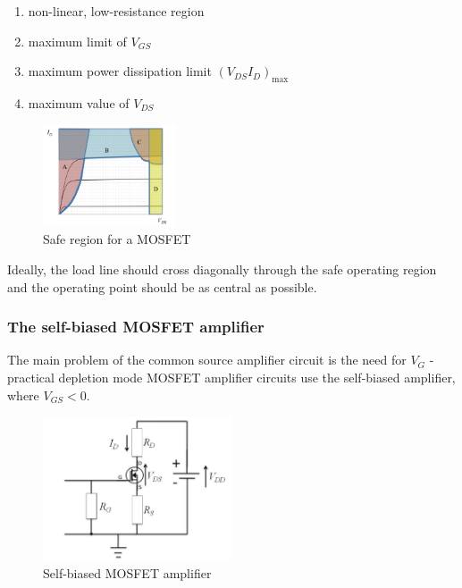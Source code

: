 \documentclass{article}
\begin{document}
\begin{enumerate}
    \item non-linear, low-resistance region
    \item maximum limit of $V_{GS}$
    \item maximum power dissipation limit $(V_{DS}I_D)_{\text{max}}$
    \item maximum value of $V_{DS}$
\end{enumerate}

\begin{figure}[h]
    \centering
    \includegraphics[width = 0.35\textwidth]{images/fet5.png}
    \caption{Safe region for a MOSFET}
    \label{fig:fet5}
\end{figure}

Ideally, the load line should cross diagonally through the safe operating region and the operating point should be as central as possible.

\subsubsection{The self-biased MOSFET amplifier}

The main problem of the common source amplifier circuit is the need for $V_G$ - practical depletion mode MOSFET amplifier circuits use the self-biased amplifier, where $V_{GS} < 0$.

\begin{figure}[h]
    \centering
    \includegraphics[width = 0.5\textwidth]{images/fet6.png}
    \caption{Self-biased MOSFET amplifier}
    \label{fig:enter-label}
\end{figure}
\end{document}

